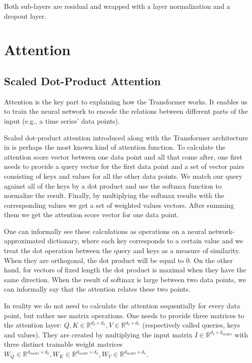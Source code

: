 \documentclass[en]{pracamgr}
\begin{document}
Both sub-layers are residual and wrapped with a layer normalization and a dropout layer.

\section{Attention}

\subsection{Scaled Dot-Product Attention}

Attention is the key part to explaining how the Transformer works.
It enables us to train the neural network to encode the relations between different parts of the input (e.g., a time series' data points).




Scaled dot-product attention introduced along with the Transformer architecture in \cite{tr} is perhaps the most known kind of attention function.
To calculate the attention score vector between one data point and all that come after, one first needs to provide a query vector for the first data point and a set of vector pairs consisting of keys and values for all the other data points. We match our query against all of the keys by a dot product and use the softmax function to normalize the result. Finally, by multiplying the softmax results with the corresponding values we get a set of weighted values vectors. After summing them we get the attention score vector for one data point.

One can informally see these calculations as operations on a neural network-approximated dictionary, where each key corresponds to a certain value and we treat the dot operation between the query and keys as a measure of similarity. When they are orthogonal, the dot product will be equal to 0. On the other hand, for vectors of fixed length the dot product is maximal when they have the same direction. When the result of softmax is large between two data points, we can informally say that the attention relates these two points.
\newline

In reality we do not need to calculate the attention sequentially for every data point, but rather use matrix operations.
One needs to provide three matrices to the attention layer: $Q, K \in \mathbb{R}^{d_I \times d_k}, V \in \mathbb{R}^{d_I \times d_v}$ (respectively called queries, keys and values). They are created by multiplying the input matrix $I \in \mathbb{R}^{d_I \times d_{model}}$ with three distinct trainable weight matrices $W_Q \in \mathbb{R}^{d_{model} \times d_k}, W_K \in \mathbb{R}^{d_{model} \times d_k}, W_V \in \mathbb{R}^{d_{model} \times d_v}$.
\end{document}
